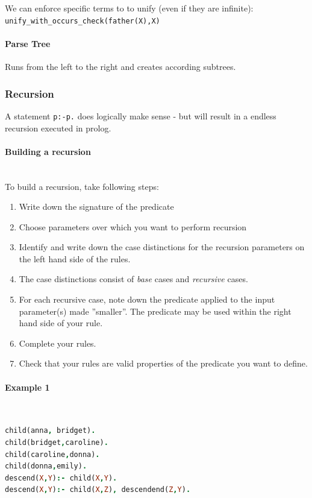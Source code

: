 We can enforce specific terms to to unify (even if they are infinite):
\lstinline|unify_with_occurs_check(father(X),X)|

\paragraph{Parse Tree}

Runs from the left to the right and creates according subtrees.


\subsubsection{Recursion}

A statement \lstinline|p:-p.| does logically make sense - but will result in a endless recursion executed in prolog.

\paragraph{Building a recursion} \hfill \\

To build a recursion, take following steps:

\begin{enumerate}
	\item Write down the signature of the predicate
	\item Choose parameters over which you want to perform recursion
	\item Identify and write down the case distinctions for the recursion parameters on the left hand side of the rules.
	\item The case distinctions consist of \emph{base} cases and \emph{recursive} cases.
	\item For each recursive case, note down the predicate applied to the input parameter(s) made ''smaller''. The predicate may be used within the right hand side of your rule.
	\item Complete your rules.
	\item Check that your rules are valid properties of the predicate you want to define.
\end{enumerate}

\paragraph{Example 1} \hfill \\

\begin{lstlisting}[language=Prolog]
child(anna, bridget).
child(bridget,caroline).
child(caroline,donna).
child(donna,emily).
descend(X,Y):- child(X,Y).
descend(X,Y):- child(X,Z), descendend(Z,Y).
\end{lstlisting}

